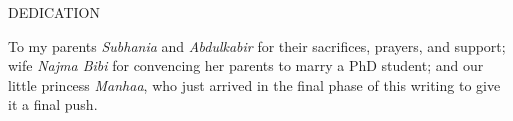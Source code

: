 \newpage
{}

\begin{center}
DEDICATION
\end{center}

\begin{center}
To my parents \textit{Subhania} and \textit{Abdulkabir} for their sacrifices, prayers, and support; wife \textit{Najma Bibi} for convencing her parents to marry a PhD student; and our little princess \textit{Manhaa}, who just arrived in the final phase of this writing to give it a final push.
\end{center}
